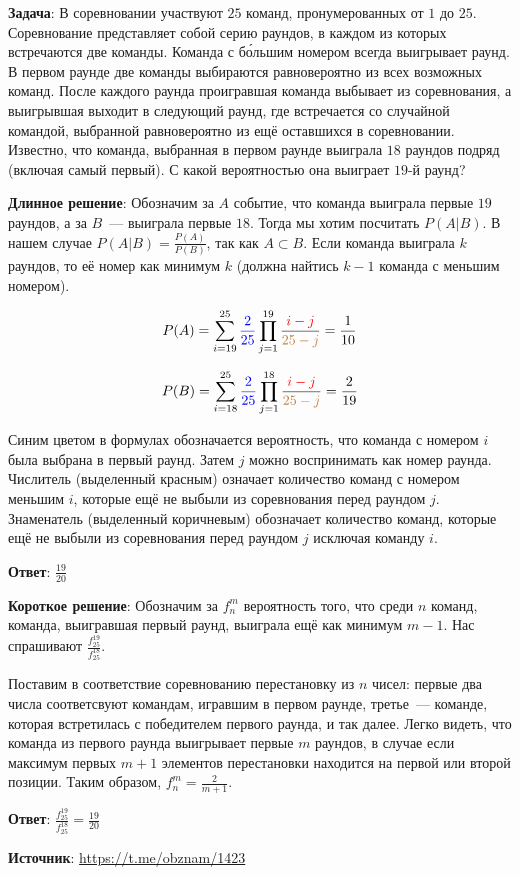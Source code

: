 \documentclass{article} %
\begin{document}
\textbf{Задача}: В соревновании участвуют $25$ команд, пронумерованных от $1$ до $25$. Соревнование представляет собой серию раундов, в каждом из которых встречаются две команды. Команда с б\'{о}льшим номером всегда выигрывает раунд. В первом раунде две команды выбираются равновероятно из всех возможных команд. После каждого раунда проигравшая команда выбывает из соревнования, а выигрывшая выходит в следующий раунд, где встречается со случайной командой, выбранной равновероятно из ещё оставшихся в соревновании. Известно, что команда, выбранная в первом раунде выиграла $18$ раундов подряд (включая самый первый). С какой вероятностью она выиграет $19$-й раунд?

\clearpage

\textbf{Длинное решение}: Обозначим за $A$ событие, что команда выиграла первые $19$ раундов, а за $B$~--- выиграла первые $18$. Тогда мы хотим посчитать $P(A|B)$. В нашем случае $P(A|B) = \frac{P(A)}{P(B)}$, так как $A \subset B$. Если команда выиграла $k$ раундов, то её номер как минимум $k$ (должна найтись $k-1$ команда с меньшим номером).

\begin{equation}
  P(A) = \sum\limits_{i=19}^{25} {\color{blue} \frac{2}{25} } \prod\limits_{j=1}^{19} \dfrac{\color{red} i - j}{\color{brown} 25 - j} = \frac{1}{10}
\end{equation}

\begin{equation}
  P(B) = \sum\limits_{i=18}^{25} {\color{blue} \frac{2}{25} } \prod\limits_{j=1}^{18} \dfrac{\color{red} i - j}{\color{brown} 25 - j} = \frac{2}{19}
\end{equation}

Синим цветом в формулах обозначается вероятность, что команда с номером $i$ была выбрана в первый раунд. Затем $j$ можно воспринимать как номер раунда. Числитель (выделенный красным) означает количество команд с номером меньшим $i$, которые ещё не выбыли из соревнования перед раундом $j$. Знаменатель (выделенный коричневым) обозначает количество команд, которые ещё не выбыли из соревнования перед раундом $j$ исключая команду $i$.

\textbf{Ответ}: $\frac{19}{20}$

\clearpage

\textbf{Короткое решение}: Обозначим за $f_n^m$ вероятность того, что среди $n$ команд, команда, выигравшая первый раунд, выиграла ещё как минимум $m-1$. Нас спрашивают $\frac{f_{25}^{19}}{f_{25}^{18}}$.

Поставим в соответствие соревнованию перестановку из $n$ чисел: первые два числа соответсвуют командам, игравшим в первом раунде, третье~--- команде, которая встретилась с победителем первого раунда, и так далее. Легко видеть, что команда из первого раунда выигрывает первые $m$ раундов, в случае если максимум первых $m+1$ элементов перестановки находится на первой или второй позиции. Таким образом, $f_{n}^m = \frac{2}{m+1}$.

\textbf{Ответ}: $\frac{f_{25}^{19}}{f_{25}^{18}} = \frac{19}{20}$

\textbf{Источник}: \url{https://t.me/obznam/1423}
\end{document}
